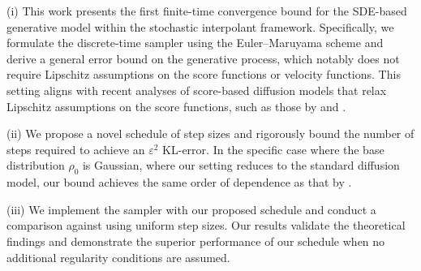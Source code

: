 (i) This work presents the first finite-time convergence bound for the SDE-based generative model within the stochastic interpolant framework. Specifically, we formulate the discrete-time sampler using the Euler–Maruyama scheme and derive a general error bound on the generative process, which notably does not require Lipschitz assumptions on the score functions or velocity functions. This setting aligns with recent analyses of score-based diffusion models that relax Lipschitz assumptions on the score functions, such as those by \citet{chen2023improved} and \citet{dlinear}.

(ii) We propose a novel  schedule of step sizes and rigorously  bound  the number of steps required to achieve an $\varepsilon^2$ KL-error. In the specific case where the base distribution $\rho_0$ is Gaussian, where our setting reduces to the standard diffusion model, our bound achieves the same order of dependence as that by \citet{chen2023improved}. %

(iii) We implement the sampler with our proposed schedule and conduct a comparison against using uniform step sizes. Our results validate the theoretical findings and demonstrate the superior performance of our schedule when no additional regularity conditions are assumed. 


